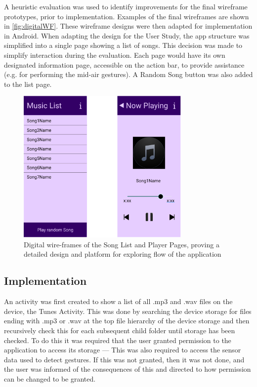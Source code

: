 \documentclass{l4proj}
\begin{document}
A heuristic evaluation was used to identify improvements for the final wireframe prototypes, prior to implementation. Examples of the final wireframes are shown in \autoref{fig:digitalWF}. These wireframe designs were then adapted for implementation in Android. When adapting the design for the User Study, the app structure was simplified into a single page showing a list of songs. This decision was made to simplify interaction during the evaluation. Each page would have its own designated information page, accessible on the action bar, to provide assistance (e.g. for performing the mid-air gestures). A Random Song button was also added to the list page.

\begin{figure}[h!]
    \centering
    \includegraphics[width=0.75\textwidth]{images/DigWireframes.PNG}
        \caption{Digital wire-frames of the Song List and Player Pages, proving a detailed design and platform for exploring flow of the application}
        \label{fig:digitalWF}
\end{figure}

\subsection{Implementation}
An activity was first created to show a list of all .mp3 and .wav files on the device, the Tunes Activity. This was done by searching the device storage for files ending with .mp3 or .wav at the top file hierarchy of the device storage and then recursively check this for each subsequent child folder until storage has been checked. To do this it was required that the user granted permission to the application to access its storage --- This was also required to access the sensor data used to detect gestures. If this was not granted, then it was not done, and the user was informed of the consequences of this and directed to how permission can be changed to be granted.
\end{document}
